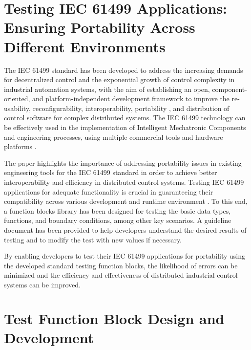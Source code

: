 \documentclass[conference]{IEEEtran}
\begin{document}
\section{Testing IEC 61499 Applications: Ensuring Portability Across Different Environments}

The IEC 61499 standard \cite{iec61499part12012} has been developed to address the increasing demands for decentralized control and the exponential growth of control complexity in industrial automation systems, with the aim of establishing an open, component-oriented, and platform-independent development framework to improve the re-usability, reconfigurability, interoperability, portability \cite{gerber2010does}, and distribution of control software for complex distributed systems. The IEC 61499 technology can be effectively used in the implementation of Intelligent Mechatronic Components and engineering processes, using multiple commercial tools and hardware platforms \cite{patil2013composition}. 

The paper \cite{pang2014portability} highlights the importance of addressing portability issues in existing engineering tools for the IEC 61499 standard in order to achieve better interoperability and efficiency in distributed control systems. Testing IEC 61499 applications for adequate functionality is crucial in guaranteeing their compatibility across various development and runtime environment \cite{hopsu2019portability}. To this end, a function blocks library has been designed for testing the basic data types, functions, and boundary conditions, among other key scenarios. A guideline document has been provided to help developers understand the desired results of testing and to modify the test with new values if necessary. 

By enabling developers to test their IEC 61499 applications for portability using the developed standard testing function blocks, the likelihood of errors can be minimized and the efficiency and effectiveness of distributed industrial control systems can be improved.



\section{Test Function Block Design and Development }
\label{sec:mainSec}
\end{document}
